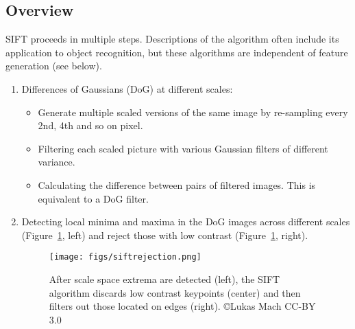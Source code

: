 \subsection{Overview}
SIFT proceeds in multiple steps. Descriptions of the algorithm often include its application to object recognition, but these algorithms are independent of feature generation (see below).

\begin{enumerate}
\item Differences of Gaussians (DoG) at different scales:
\begin{itemize}
\item Generate multiple scaled versions of the same image by re-sampling every 2nd, 4th and so on pixel.
\item Filtering each scaled picture with various Gaussian filters of different variance.
\item Calculating the difference between pairs of filtered images. This is equivalent to a DoG filter.
\end{itemize}

\item Detecting local minima and maxima in the DoG images across different scales (Figure~\ref{fig:siftrejection}, left) and reject those with low contrast (Figure~\ref{fig:siftrejection}, right).

\begin{figure}
	\centering
		\texttt{[image: figs/siftrejection.png]}
	\caption{After scale space extrema are detected (left), the SIFT algorithm discards low contrast keypoints (center) and then filters out those located on edges (right). \copyright Lukas Mach CC-BY 3.0}
	\label{fig:siftrejection}
\end{figure}


\end{enumerate}
